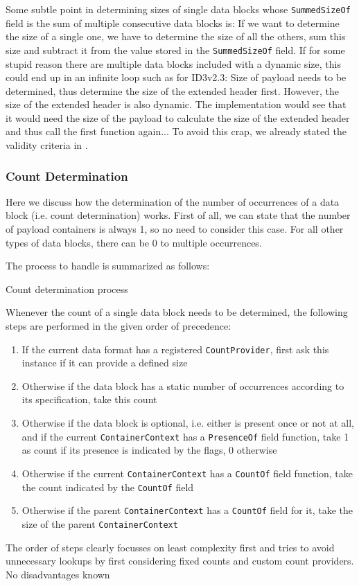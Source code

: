 Some subtle point in determining sizes of single data blocks whose \texttt{SummedSizeOf} field is the sum of multiple consecutive data blocks is: If we want to determine the size of a single one, we have to determine the size of all the others, sum this size and subtract it from the value stored in the \texttt{SummedSizeOf} field. If for some stupid reason there are multiple data blocks included with a dynamic size, this could end up in an infinite loop such as for ID3v2.3: Size of payload needs to be determined, thus determine the size of the extended header first. However, the size of the extended header is also dynamic. The implementation would see that it would need the size of the payload to calculate the size of the extended header and thus call the first function again... To avoid this crap, we already stated the validity criteria in .

\subsubsection{Count Determination}%
\label{sec:CountDetermination}%

Here we discuss how the determination of the number of occurrences of a data block (i.e. count determination) works. First of all, we can state that the number of payload containers is always 1, so no need to consider this case. For all other types of data blocks, there can be 0 to multiple occurrences.

The process to handle is summarized as follows:

{%
Count determination process
}
{%
  Whenever the count of a single data block needs to be determined, the following steps are performed in the given order of precedence:
\begin{enumerate}
\item If the current data format has a registered \texttt{CountProvider}, first ask this instance if it can provide a defined size
\item Otherwise if the data block has a static number of occurrences according to its specification, take this count
\item Otherwise if the data block is optional, i.e. either is present once or not at all, and if the current \texttt{ContainerContext} has a \texttt{PresenceOf} field function, take 1 as count if its presence is indicated by the flags, 0 otherwise
\item Otherwise if the current \texttt{ContainerContext} has a \texttt{CountOf} field function, take the count indicated by the \texttt{CountOf} field
\item Otherwise if the parent \texttt{ContainerContext} has a \texttt{CountOf} field for it, take the size of the parent \texttt{ContainerContext}
\end{enumerate}
}
{%
The order of steps clearly focusses on least complexity first and tries to avoid unnecessary lookups by first considering fixed counts and custom count providers.
}
{%
No disadvantages known
}

